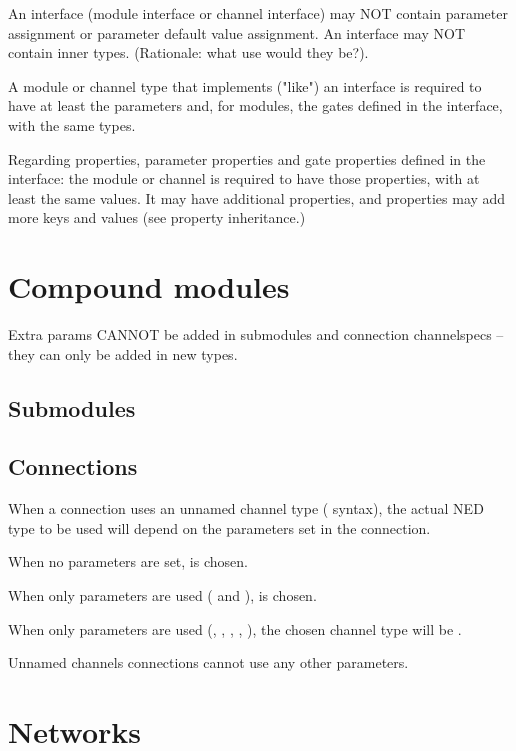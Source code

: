 An interface (module interface or channel interface) may NOT contain
parameter assignment or parameter default value assignment. An interface
may NOT contain inner types. (Rationale: what use would they be?).

A module or channel type that implements ("like") an interface is
required to have at least the parameters and, for modules, the gates
defined in the interface, with the same types.

Regarding properties, parameter properties and gate properties defined
in the interface: the module or channel is required to have those properties,
with at least the same values. It may have additional properties,
and properties may add more keys and values (see property inheritance.)


\section{Compound modules}

Extra params CANNOT be added in submodules and connection channelspecs --
they can only be added in new types.

\subsection{Submodules}

\subsection{Connections}

When a connection uses an unnamed channel type (\ttt{-{}->
\{\ldots\} -{}->} syntax), the actual NED type to be used will depend on the
parameters set in the connection.

When no parameters are set,  is chosen.

When only  parameters are used (
and ),  is chosen.

When only  parameters are used
(, , , , ),
the chosen channel type will be .

Unnamed channels connections cannot use any other parameters.

\section{Networks}

